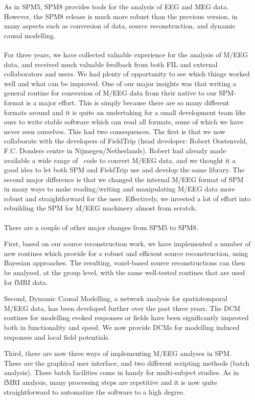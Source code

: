  As in SPM5, SPM8 provides tools for the analysis of EEG and MEG data. However, the SPM8 release is much more robust than the previous version, in many aspects such as conversion of data, source reconstruction, and dynamic causal modelling.
\\
\\
For three years, we have collected valuable experience for the analysis of M/EEG data, and received much valuable feedback from both FIL and external collaborators and users. We had plenty of opportunity to see which things worked well and what can be improved. One of our major insights was that writing a general routine for conversion of M/EEG data from their native to our SPM-format is a major effort. This is simply because there are so many different formats around and it is quite an undertaking for a small development team like ours to write stable software which can read all formats, some of which we have never seen ourselves. This had two consequences. The first is that we now collaborate with the developers of FieldTrip (head developer: Robert Oostenveld, F.C. Donders centre in Nijmegen/Netherlands). Robert had already made available a wide range of \matlab\ code to convert M/EEG data, and we thought it a good idea to let both SPM and FieldTrip use and develop the same library. The second major difference is that we changed the internal M/EEG format of SPM in many ways to make reading/writing and manipulating M/EEG data more robust and straightforward for the user. Effectively, we invested a lot of effort into rebuilding the SPM for M/EEG machinery almost from scratch.
\\
\\
There are a couple of other major changes from SPM5 to SPM8.

First, based on our source reconstruction work, we have implemented a number of new routines which provide for a robust and efficient source reconstruction, using Bayesian approaches. The resulting, voxel-based source reconstructions can then be analysed, at the group level, with the same well-tested routines that are used for fMRI data.

Second, Dynamic Causal Modelling, a network analysis for spatiotemporal M/EEG data, has been developed further over the past three years. The DCM routines for modelling evoked responses or fields have been significantly improved both in functionality and speed. We now provide DCMs for modelling induced responses and local field potentials.

Third, there are now three ways of implementing M/EEG analyses in SPM. These are the graphical user interface, and two different scripting methods (batch analysis). These batch facilities come in handy for multi-subject studies. As in fMRI analysis, many processing steps are repetitive and it is now quite straightforward to automatize the software to a high degree.

